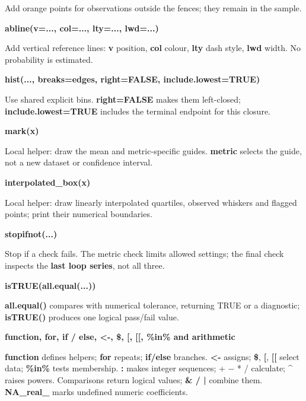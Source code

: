 \documentclass[11pt,a4paper]{article}
\begin{document}
Add orange points for observations outside the fences; they remain in the sample.

\par\noindent\textbf{abline(v=..., col=..., lty=..., lwd=...)}

Add vertical reference lines: \textbf{v} position, \textbf{col} colour, \textbf{lty} dash style, \textbf{lwd} width. No probability is estimated.

\par\noindent\textbf{hist(..., breaks=edges, right=FALSE, include.lowest=TRUE)}

Use shared explicit bins. \textbf{right=FALSE} makes them left-closed; \textbf{include.lowest=TRUE} includes the terminal endpoint for this closure.

\par\noindent\textbf{mark(x)}

Local helper: draw the mean and metric-specific guides. \textbf{metric} selects the guide, not a new dataset or confidence interval.

\par\noindent\textbf{interpolated\_box(x)}

Local helper: draw linearly interpolated quartiles, observed whiskers and flagged points; print their numerical boundaries.

\par\noindent\textbf{stopifnot(...)}

Stop if a check fails. The metric check limits allowed settings; the final check inspects the \textbf{last loop series}, not all three.

\par\noindent\textbf{isTRUE(all.equal(...))}

\textbf{all.equal()} compares with numerical tolerance, returning TRUE or a diagnostic; \textbf{isTRUE()} produces one logical pass/fail value.

\par\noindent\textbf{function, for, if / else, <-, \$, [, [[, \%in\% and arithmetic}

\textbf{function} defines helpers; \textbf{for} repeats; \textbf{if/else} branches. \textbf{<-} assigns; \textbf{\$}, \textbf{[}, \textbf{[[} select data; \textbf{\%in\%} tests membership. \textbf{:} makes integer sequences; + \ensuremath{-} * / calculate; \textbf{\textasciicircum{}} raises powers. Comparisons return logical values; \textbf{\& / |} combine them. \textbf{NA\_real\_} marks undefined numeric coefficients.

\medskip
\end{document}
